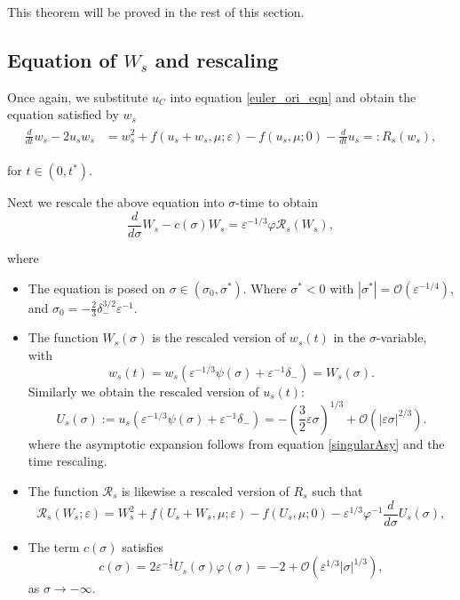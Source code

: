 \documentclass[letterpaper,11pt]{article}
\newcommand{\Ral}{\mathcal{R}}
\newcommand{\rmO}{\mathcal{O}}
\newcommand{\eps}{\varepsilon}
\numberwithin{equation}{section}
\theoremstyle{plain}
\begin{document}
This theorem will be proved in the rest of this section.

\subsection{Equation of \texorpdfstring{$W_{s}$}{Ws} and rescaling }

Once again, we substitute $u_C$ into equation \eqref{euler_ori_eqn} and obtain the equation satisfied by $w_s$
\begin{align}\label{Eqn_ws}
\begin{split}
\frac{d}{dt} w_{s} -2u_sw_s &=   w_s^2 + f(u_s+w_s, \mu; \eps)-f(u_s, \mu; 0) - \frac{d}{dt}u_s =: R_s(w_s),
\end{split}
\end{align}

for $t\in (0, t^*)$.

Next we rescale the above equation into $\sigma$-time to obtain
\begin{equation}
\frac{d}{d\sigma} W_s - c(\sigma)W_s = \eps^{-1/3}\varphi \Ral_s(W_s),
\end{equation}


where 
\begin{itemize}
\item The equation is posed on $\sigma \in \left(\sigma_0, \sigma^*\right).$ Where $\sigma^*<0$ with $|\sigma^*| = \rmO(\eps^{-1/4})$, and $\sigma_0  =-\frac{2}{3}\delta_-^{3/2}\eps^{-1}$.

\item The function $W_s(\sigma)$ is the rescaled version of $w_s(t)$ in the $\sigma$-variable, with 
\[
w_s(t) = w_s(\eps^{-1/3}\psi(\sigma)+\eps^{-1}\delta_-) = W_s(\sigma). 
\]
Similarly we obtain the rescaled version of $u_s(t)$:
\begin{equation}\label{sing_exp}
U_s(\sigma) :=u_s(\eps^{-1/3}\psi(\sigma)+\eps^{-1}\delta_-)= -\left(\frac{3}{2}\eps \sigma\right)^{1/3} + \rmO(|\eps \sigma|^{2/3} ).
\end{equation}
where the asymptotic expansion follows from equation \eqref{singularAsy} and the time rescaling.
\item The function $\Ral_s$ is likewise a rescaled version of $R_s$ such that 
\[
\Ral_s(W_s;\eps) = W_s^2+ f(U_s+W_s, \mu ; \eps)-f(U_s,\mu;0)- \eps^{1/3}\varphi^{-1} \frac{d}{d\sigma}U_s(\sigma),
\] 


\item The term $c(\sigma)$ satisfies
\[
c(\sigma) = 2\eps^{-\frac{1}{3}}U_s(\sigma)\varphi(\sigma) = -2 + \rmO(\eps^{1/3}|\sigma|^{1/3}),
\]
as $\sigma \to -\infty$.


\end{itemize}
 
\end{document}
